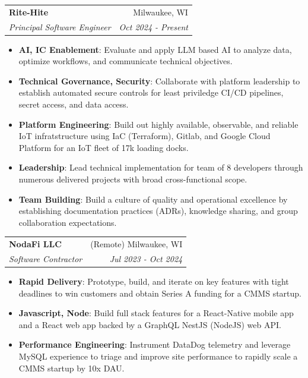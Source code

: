 \documentclass[letterpaper,11pt]{article}
\makeatletter
\newcommand{\resumeItem}[2]{
  \item\small{
    \textbf{#1}{: #2 \vspace{-2pt}}
  }
}
\newcommand{\resumeSubheading}[4]{
  \vspace{-1pt}\item
    \begin{tabular*}{0.97\textwidth}{l@{\extracolsep{\fill}}r}
      \textbf{#1} & #2 \\
      \textit{\small#3} & \textit{\small #4} \\
    \end{tabular*}\vspace{-5pt}
}
\newcommand{\resumeItemListStart}{\begin{itemize}}
\newcommand{\resumeItemListEnd}{\end{itemize}\vspace{-5pt}}
\makeatother
\begin{document}
    \resumeSubheading
      {Rite-Hite}{Milwaukee, WI}
      {Principal Software Engineer}{Oct 2024 - Present}
      \resumeItemListStart
        \resumeItem{AI, IC Enablement}
          {Evaluate and apply LLM based AI to analyze data, optimize workflows, and communicate technical objectives.}
        \resumeItem{Technical Governance, Security}
          {Collaborate with platform leadership to establish automated secure controls for least priviledge CI/CD pipelines, secret access, and data access.}
        \resumeItem{Platform Engineering}
          {Build out highly available, observable, and reliable IoT infratstructure using IaC (Terraform), Gitlab, and Google Cloud Platform for an IoT fleet of 17k loading docks.}
        \resumeItem{Leadership}
          {Lead technical implementation for team of 8 developers through numerous delivered projects with broad cross-functional scope.}
        \resumeItem{Team Building}
          {Build a culture of quality and operational excellence by establishing documentation practices (ADRs), knowledge sharing, and group collaboration expectations.} 
      \resumeItemListEnd

    \resumeSubheading
      {NodaFi LLC}{(Remote) Milwaukee, WI}
      {Software Contractor}{Jul 2023 - Oct 2024}
      \resumeItemListStart
        \resumeItem{Rapid Delivery}
          {Prototype, build, and iterate on key features with tight deadlines to win customers and obtain Series A funding for a CMMS startup.}
        \resumeItem{Javascript, Node}
          {Build full stack features for a React-Native mobile app and a React web app backed by a GraphQL NestJS (NodeJS) web API.}
        \resumeItem{Performance Engineering}
          {Instrument DataDog telemetry and leverage MySQL experience to triage and improve site performance to rapidly scale a CMMS startup by 10x DAU.}
      \resumeItemListEnd
\end{document}
